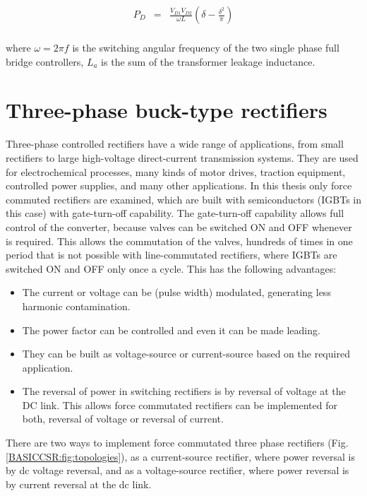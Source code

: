 \begin{equation}
        \begin{array}{rcl}
            P_D&=&\frac{V_{D1}V_{D2}}{\omega L}\left(\delta-\frac{\delta^2}{\pi}\right)\\
        \end{array}
        \label{BASICMPC:equ:DCDC}
    \end{equation}
		
		where $\omega=2\pi f$ is the switching angular frequency of the two single phase full bridge controllers, $L_a$ is the
sum of the transformer leakage inductance. 

\section{Three-phase buck-type rectifiers}\label{BASICCSR:sec:CSR}

Three-phase controlled rectifiers have a wide range of applications, from small rectifiers to large high-voltage direct-current
transmission systems. They are used for electrochemical processes, many kinds of motor drives, traction equipment, controlled power supplies, and many other applications. In this thesis only force commuted rectifiers are examined, which are built with semiconductors (IGBTs in this case) with gate-turn-off capability. The gate-turn-off capability allows full control of the converter, because valves can be switched ON and OFF whenever is required. This allows the commutation of the valves, hundreds of times in one period that is not possible with line-commutated rectifiers, where IGBTs are switched ON and OFF only once a cycle. This has the following advantages:

\begin{itemize}
\item The current or voltage can be (pulse width) modulated, generating less harmonic contamination.
\item The power factor can be controlled and even it can be made leading.
\item They can be built as voltage-source or current-source based on the required application.
\item The reversal of power in switching rectifiers is by reversal of voltage at the DC link. This allows force commutated rectifiers can be implemented for both, reversal of voltage or reversal of current.
\end{itemize}

There are two ways to implement force commutated three phase rectifiers (Fig.\ref{BASICCSR:fig:topologies}), as a current-source rectifier, where power reversal is by dc voltage reversal, and as a voltage-source rectifier, where power reversal is by current reversal at the dc link.

